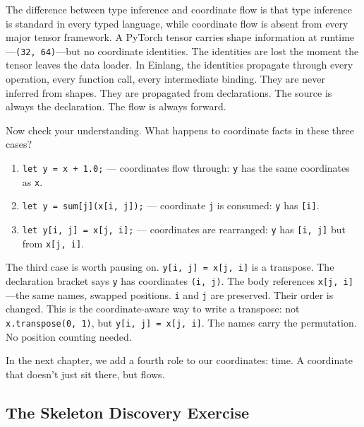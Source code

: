 \documentclass[11pt,titlepage]{article}
\providecommand{\tightlist}{%
  \setlength{\itemsep}{0pt}\setlength{\parskip}{0pt}}
\begin{document}
The difference between type inference and coordinate flow is that type
inference is standard in every typed language, while coordinate flow is
absent from every major tensor framework. A PyTorch tensor carries shape
information at runtime---\texttt{(32,\ 64)}---but no coordinate
identities. The identities are lost the moment the tensor leaves the
data loader. In Einlang, the identities propagate through every
operation, every function call, every intermediate binding. They are
never inferred from shapes. They are propagated from declarations. The
source is always the declaration. The flow is always forward.

Now check your understanding. What happens to coordinate facts in these
three cases?

\begin{enumerate}
\def\labelenumi{\arabic{enumi}.}
\tightlist
\item
  \texttt{let\ y\ =\ x\ +\ 1.0;} --- coordinates flow through:
  \texttt{y} has the same coordinates as \texttt{x}.
\item
  \texttt{let\ y\ =\ sum{[}j{]}(x{[}i,\ j{]});} --- coordinate
  \texttt{j} is consumed: \texttt{y} has \texttt{{[}i{]}}.
\item
  \texttt{let\ y{[}i,\ j{]}\ =\ x{[}j,\ i{]};} --- coordinates are
  rearranged: \texttt{y} has \texttt{{[}i,\ j{]}} but from
  \texttt{x{[}j,\ i{]}}.
\end{enumerate}

The third case is worth pausing on.
\texttt{y{[}i,\ j{]}\ =\ x{[}j,\ i{]}} is a transpose. The declaration
bracket says \texttt{y} has coordinates \texttt{(i,\ j)}. The body
references \texttt{x{[}j,\ i{]}}---the same names, swapped positions.
\texttt{i} and \texttt{j} are preserved. Their order is changed. This is
the coordinate-aware way to write a transpose: not
\texttt{x.transpose(0,\ 1)}, but \texttt{y{[}i,\ j{]}\ =\ x{[}j,\ i{]}}.
The names carry the permutation. No position counting needed.

\vspace{2em}

In the next chapter, we add a fourth role to our coordinates: time. A
coordinate that doesn't just sit there, but flows.

\vspace{2em}

\hypertarget{the-skeleton-discovery-exercise}{%
\subsection{The Skeleton Discovery
Exercise}\label{the-skeleton-discovery-exercise}}
\end{document}
